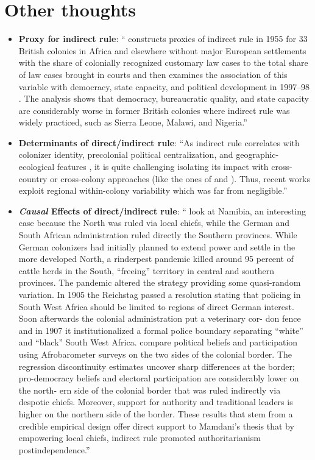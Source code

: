 \documentclass[11pt,a4paper]{article}
\begin{document}
	\clearpage
	\section{Other thoughts}
	\begin{itemize}
		\item \textbf{Proxy for indirect rule}: ``\textcite{Lange2009} constructs proxies of indirect	rule in 1955 for 33 British colonies in Africa and elsewhere without major European settlements with the share of colonially recognized customary law cases to the total share of law cases brought in courts and then examines the association of this variable with democracy, state capacity, and political development in 1997–98 . The analysis shows that democracy, bureaucratic quality, and state capacity are considerably worse in former British colonies where indirect rule was widely practiced, such as Sierra Leone, Malawi, and Nigeria.'' \parencite[61]{Michalopoulos2020}
		\item \textbf{Determinants of direct/indirect rule}: ``As indirect rule correlates with colonizer identity, precolonial political centralization, \parencite{Gerring2011} and geographic-ecological features \parencite{DeJuan2017}, it is quite challenging isolating its impact with cross- country or cross-colony approaches (like the ones of \textcite{Lange2009} and \textcite{Ali2019}). Thus, recent works exploit regional within-colony variability which was far from negligible.'' \parencite[63]{Michalopoulos2020}
		\item \textbf{\emph{Causal} Effects of direct/indirect rule}: ``\textcite{Lechler2018} look at Namibia, an interesting case because the North was ruled via local chiefs, while the German and South African administration ruled directly the Southern provinces. While German colonizers had initially planned to extend power and settle in the more developed North, a rinderpest pandemic killed around 95 percent of cattle herds in the South, ``freeing'' territory in central and southern provinces. The pandemic altered the strategy providing some quasi-random variation. In 1905 the Reichstag passed a resolution stating that policing in South West Africa should be limited to regions of direct German interest. Soon afterwards the colonial administration put a veterinary cor- don fence and in 1907 it institutionalized a formal police boundary separating ``white'' and ``black'' South West Africa. \textcite{Lechler2018} compare political beliefs and participation using Afrobarometer surveys on the two sides of the colonial border. The regression discontinuity estimates uncover sharp differences at the border; pro-democracy beliefs and electoral participation are considerably lower on the north- ern side of the colonial border that was ruled indirectly via despotic chiefs. Moreover, support for authority and traditional leaders is higher on the northern side of the border. These results that stem from a credible empirical design offer direct support to Mamdani’s thesis that by empowering local chiefs, indirect rule promoted authoritarianism postindependence.'' \parencite[64]{Michalopoulos2020}

\end{itemize}
\end{document}
